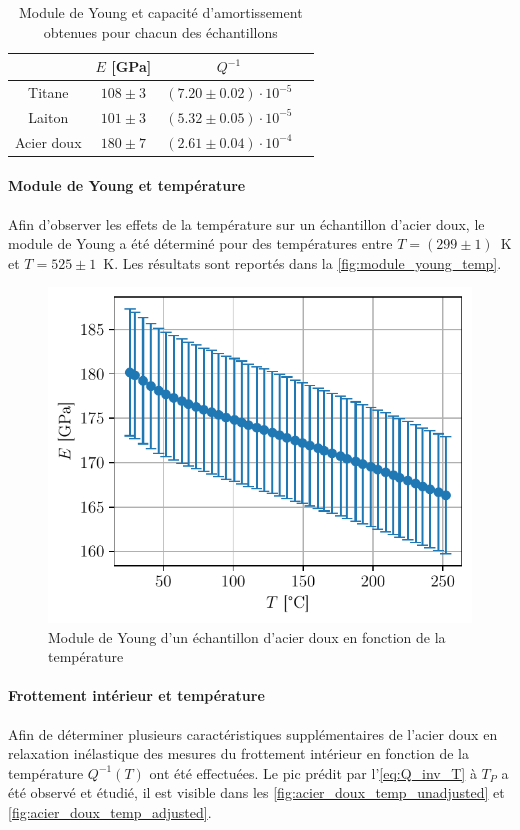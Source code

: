 \begin{table}[h]
    \centering
    \begin{tabulary}{0.9\linewidth}{c|C C C}
        \toprule
        & \(E\) [\si{\giga\pascal}] & \(Q^{-1}\) \\
        \midrule
        Titane & \(108 \pm 3\) & \(\left(7.20 \pm 0.02\right) \cdot 10^{-5}\) \\
        Laiton & \(101 \pm 3\) & \(\left(5.32 \pm 0.05\right) \cdot 10^{-5}\) \\
        Acier doux & \(180 \pm 7\) & \(\left(2.61 \pm 0.04\right) \cdot 10^{-4}\) \\
        \bottomrule
    \end{tabulary}    
    \caption{Module de Young et capacité d'amortissement obtenues pour chacun des échantillons}
    \label{tab:young_amortissement}
\end{table}

\paragraph{Module de Young et température} Afin d'observer les effets de la température sur un échantillon d'acier doux, le module de Young a été déterminé pour des températures entre \mbox{\(T = (299 \pm 1)\) \si{\kelvin}} et \mbox{\(T = 525 \pm 1\) \si{\kelvin}}. Les résultats sont reportés dans la \autoref{fig:module_young_temp}.

\begin{figure}[h]
    \centering
    \includegraphics[width=0.6\linewidth]{figures/acier_doux_module_young_temp.pdf}
    \caption{Module de Young d'un échantillon d'acier doux en fonction de la température}
    \label{fig:module_young_temp}
\end{figure}

\paragraph{Frottement intérieur et température} Afin de déterminer plusieurs caractéristiques supplémentaires de l'acier doux en relaxation inélastique des mesures du frottement intérieur en fonction de la température $Q^{-1}(T)$ ont été effectuées. Le pic prédit par l'\autoref{eq:Q_inv_T} à $T_P$ a été observé et étudié, il est visible dans les \autoref{fig:acier_doux_temp_unadjusted} et \autoref{fig:acier_doux_temp_adjusted}.

